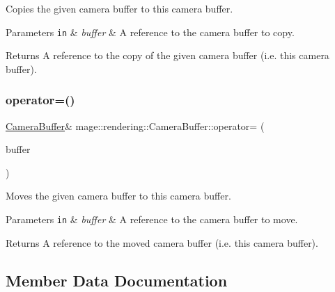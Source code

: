 Copies the given camera buffer to this camera buffer.


\begin{DoxyParams}[1]{Parameters}
\mbox{\tt in}  & {\em buffer} & A reference to the camera buffer to copy. \\
\hline
\end{DoxyParams}
\begin{DoxyReturn}{Returns}
A reference to the copy of the given camera buffer (i.\+e. this camera buffer). 
\end{DoxyReturn}
\hypertarget{structmage_1_1rendering_1_1_camera_buffer_a12658ff989daac2e910b91633ac0223d}{}\label{structmage_1_1rendering_1_1_camera_buffer_a12658ff989daac2e910b91633ac0223d} 
\subsubsection{\texorpdfstring{operator=()}{operator=()}\hspace{0.1cm}{\footnotesize\ttfamily [2/2]}}
{\footnotesize\ttfamily \hyperlink{structmage_1_1rendering_1_1_camera_buffer}{Camera\+Buffer}\& mage\+::rendering\+::\+Camera\+Buffer\+::operator= (\begin{DoxyParamCaption}\item[{\hyperlink{structmage_1_1rendering_1_1_camera_buffer}{Camera\+Buffer} \&\&}]{buffer }\end{DoxyParamCaption})\hspace{0.3cm}{\ttfamily [default]}}

Moves the given camera buffer to this camera buffer.


\begin{DoxyParams}[1]{Parameters}
\mbox{\tt in}  & {\em buffer} & A reference to the camera buffer to move. \\
\hline
\end{DoxyParams}
\begin{DoxyReturn}{Returns}
A reference to the moved camera buffer (i.\+e. this camera buffer). 
\end{DoxyReturn}


\subsection{Member Data Documentation}
\hypertarget{structmage_1_1rendering_1_1_camera_buffer_a75669aa0916514b1d414e5a2f7c72c75}{}\label{structmage_1_1rendering_1_1_camera_buffer_a75669aa0916514b1d414e5a2f7c72c75} 
